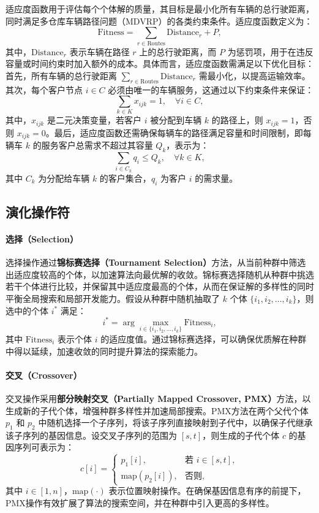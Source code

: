 \documentclass[12pt,a4paper,oneside]{ctexart}
\begin{document}
适应度函数用于评估每个个体解的质量，其目标是最小化所有车辆的总行驶距离，同时满足多仓库车辆路径问题（MDVRP）的各类约束条件。适应度函数定义为：
\begin{equation}
	\text{Fitness} = \sum_{r \in \text{Routes}} \text{Distance}_r + P,
\end{equation}
其中，$\text{Distance}_r$ 表示车辆在路径 $r$ 上的总行驶距离，而 $P$ 为惩罚项，用于在违反容量或时间约束时加入额外的成本。具体而言，适应度函数需满足以下优化目标：首先，所有车辆的总行驶距离 $\sum_{r \in \text{Routes}} \text{Distance}_r$ 需最小化，以提高运输效率。其次，每个客户节点 $i \in C$ 必须由唯一的车辆服务，这通过以下约束条件来保证：
\begin{equation}
	\sum_{k \in K} x_{ijk} = 1, \quad \forall i \in C,
\end{equation}
其中，$x_{ijk}$ 是二元决策变量，若客户 $i$ 被分配到车辆 $k$ 的路径上，则 $x_{ijk} = 1$，否则 $x_{ijk} = 0$。最后，适应度函数还需确保每辆车的路径满足容量和时间限制，即每辆车 $k$ 的服务客户总需求不超过其容量 $Q_k$，表示为：
\begin{equation}
	\sum_{i \in C_k} q_i \leq Q_k, \quad \forall k \in K,
\end{equation}
其中 $C_k$ 为分配给车辆 $k$ 的客户集合，$q_i$ 为客户 $i$ 的需求量。

\subsection{演化操作符}

\paragraph{选择（Selection）} 

选择操作通过\textbf{锦标赛选择（Tournament Selection）}方法，从当前种群中筛选出适应度较高的个体，以加速算法向最优解的收敛。锦标赛选择随机从种群中挑选若干个体进行比较，并保留其中适应度最高的个体，从而在保证解的多样性的同时平衡全局搜索和局部开发能力。假设从种群中随机抽取了 $k$ 个体 $\{i_1, i_2, \ldots, i_k\}$，则选中的个体 $i^*$ 满足：
\[
i^* = \arg \max_{i \in \{i_1, i_2, \ldots, i_k\}} \text{Fitness}_i,
\]
其中 $\text{Fitness}_i$ 表示个体 $i$ 的适应度值。通过锦标赛选择，可以确保优质解在种群中得以延续，加速收敛的同时提升算法的探索能力。

\paragraph{交叉（Crossover）}

交叉操作采用\textbf{部分映射交叉（Partially Mapped Crossover, PMX）}方法，以生成新的子代个体，增强种群多样性并加速局部搜索。PMX方法在两个父代个体 $p_1$ 和 $p_2$ 中随机选择一个子序列，将该子序列直接映射到子代中，以确保子代继承该子序列的基因信息。设交叉子序列的范围为 $[s, t]$，则生成的子代个体 $c$ 的基因序列可表示为：
\[
c[i] = \begin{cases} 
	p_1[i], & \text{若 } i \in [s, t], \\
	\text{map}(p_2[i]), & \text{否则},
\end{cases}
\]
其中 $i \in [1, n]$，$\text{map}(\cdot)$ 表示位置映射操作。在确保基因信息有序的前提下，PMX操作有效扩展了算法的搜索空间，并在种群中引入更高的多样性。
\end{document}
